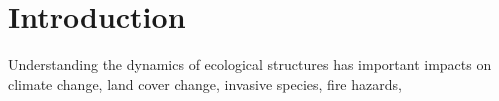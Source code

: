 \chapter{Introduction}%

Understanding the dynamics of ecological structures has important impacts on climate change, land cover change, invasive species, fire hazards, 
